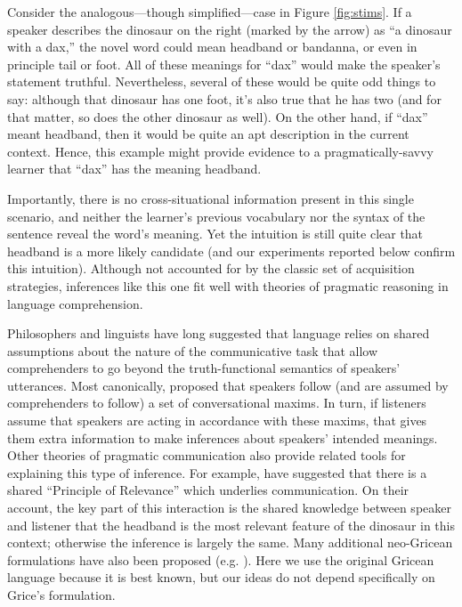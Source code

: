 \documentclass[review]{elsarticle}
\begin{document}
Consider the analogous---though simplified---case in Figure \ref{fig:stims}. If a speaker describes the dinosaur on the right (marked by the arrow) as ``a dinosaur with a dax,'' the novel word could mean {\sc headband} or {\sc bandanna}, or even in principle {\sc tail} or {\sc foot}. All of these meanings for ``dax'' would make the speaker's statement truthful. Nevertheless, several of these would be quite odd things to say: although that dinosaur has one foot, it's also true that he has two (and for that matter, so does the other dinosaur as well). On the other hand, if ``dax'' meant {\sc headband}, then it would be quite an apt description in the current context. Hence, this example might provide evidence to a pragmatically-savvy learner that ``dax'' has the meaning {\sc headband}. 

Importantly, there is no cross-situational information present in this single scenario, and neither the learner's previous vocabulary nor the syntax of the sentence reveal the word's meaning. Yet the intuition is still quite clear that {\sc headband} is a more likely candidate (and our experiments reported below confirm this intuition). Although not accounted for by the classic set of acquisition strategies, inferences like this one fit well with theories of pragmatic reasoning in language comprehension. 


Philosophers and linguists have long suggested that language relies on shared assumptions about the nature of the communicative task that allow comprehenders to go beyond the truth-functional semantics of speakers' utterances. Most canonically, \citet{grice1975} proposed that speakers follow (and are assumed by comprehenders to follow) a set of conversational maxims. In turn, if listeners assume that speakers are acting in accordance with these maxims, that gives them extra information to make inferences about speakers' intended meanings. Other theories of pragmatic communication also provide related tools for explaining this type of inference. For example, \citet{sperber1986} have suggested that there is a shared ``Principle of Relevance'' which underlies communication. On their account, the key part of this interaction is the shared knowledge between speaker and listener that the headband is the most relevant feature of the dinosaur in this context; otherwise the inference is largely the same. Many additional neo-Gricean formulations have also been proposed (e.g. \citealp{clark1996,levinson2000}). Here we use the original Gricean language because it is best known, but our ideas do not depend specifically on Grice's formulation.
\end{document}
